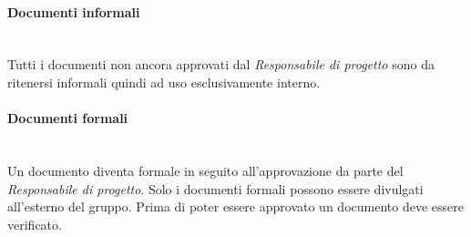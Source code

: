 \paragraph{Documenti informali}\mbox{}\\
Tutti i documenti non ancora approvati dal \textit{Responsabile di progetto} sono da ritenersi informali quindi ad uso esclusivamente interno.

\paragraph{Documenti formali}\mbox{}\\
Un documento diventa formale in seguito all'approvazione da parte del \textit{Responsabile di progetto}. Solo i documenti formali possono essere divulgati all'esterno del gruppo. Prima di poter essere approvato un documento deve essere verificato. 

